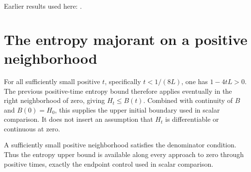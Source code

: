 \documentclass[11pt,a4paper]{article}
\begin{document}
Earlier results used here: \cite[Section~3.26.3]{LangevinLean2026ULASC}.

\section{\texorpdfstring{The entropy majorant on a positive neighborhood}{The entropy majorant on a positive neighborhood}}


For all sufficiently small positive \(t\), specifically \(t<1/(8L)\), one has \(1-4tL>0\). The previous positive-time entropy bound therefore applies eventually in the right neighborhood of zero, giving \(H_t\le B(t)\). Combined with continuity of \(B\) and \(B(0)=H_0\), this supplies the upper initial boundary used in scalar comparison. It does not insert an assumption that \(H_t\) is differentiable or continuous at zero.



A sufficiently small positive neighborhood satisfies the denominator condition. Thus the entropy upper bound is available along every approach to zero through positive times, exactly the endpoint control used in scalar comparison.
\end{document}
